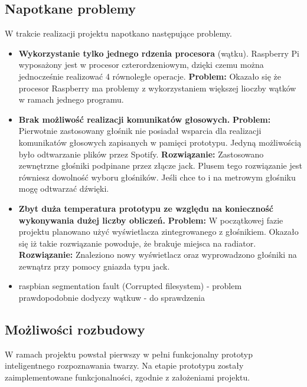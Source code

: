 \documentclass[a4paper,12pt,reqno]{article}
\begin{document}
\subsection{Napotkane problemy}
W trakcie realizacji projektu napotkano następujące problemy.
\begin{itemize}
	\item \textbf{Wykorzystanie tylko jednego rdzenia procesora} (wątku). Raspberry Pi wyposażony jest w procesor czterordzeniowym, dzięki czemu można jednocześnie realizować 4 równoległe operacje. \newline \textbf{\textcolor{to_change}{Problem:}} \newline Okazało się że procesor Raspberry ma problemy z wykorzystaniem większej lioczby wątków w ramach jednego programu.
	\item \textbf{Brak możliwość realizacji komunikatów głosowych.} \newline \textbf{\textcolor{to_change}{Problem:}} \newline Pierwotnie zastosowany głośnik nie posiadał wsparcia dla realizacji komunikatów głosowych zapisanych w pamięci prototypu. Jedyną możliwością było odtwarzanie plików przez Spotify. \newline \textbf{\textcolor{to_change}{Rozwiązanie:}} \newline Zastosowano zewnętrzne głośniki podpinane przez złącze jack. \textcolor{new}{Plusem tego rozwiązanie jest równiesz dowolność wyboru głośników. Jeśli chce to i na metrowym głośniku mogę odtwarzać dźwięki.}
	\item \textbf{Zbyt duża temperatura prototypu ze względu na konieczność wykonywania dużej liczby obliczeń.} \newline \textbf{\textcolor{to_change}{Problem:}} \newline W początkowej fazie projektu planowano użyć wyświetlacza zintegrowanego z głośnikiem. Okazało się iż takie rozwiązanie powoduje, że brakuje miejsca na radiator. \newline \textbf{\textcolor{to_change}{Rozwiązanie:}} \newline Znaleziono nowy wyświetlacz oraz wyprowadzono głośniki na zewnątrz przy pomocy gniazda typu jack.
	\item raspbian segmentation fault (Corrupted filesystem) - problem prawdopodobnie dodyczy wątkuw - do sprawdzenia
\end{itemize}

\subsection{Możliwości rozbudowy}
W ramach projektu powstał pierwszy w pełni funkcjonalny prototyp inteligentnego rozpoznawania twarzy. Na etapie prototypu zostały zaimplementowane funkcjonalności, zgodnie z założeniami projektu.
\end{document}
